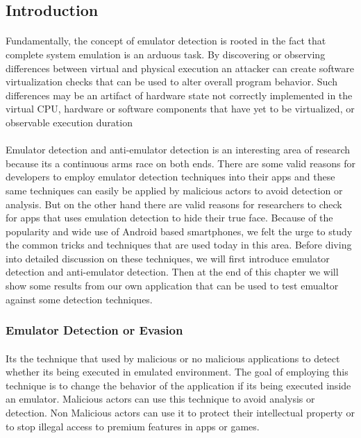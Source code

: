 \documentclass[../main.tex]{subfile}
\begin{document}
	\subsection{Introduction}\label{sec::intorduction}
	\paragraph{} Fundamentally, the concept of emulator detection is rooted in the fact that complete system emulation is an arduous task. By discovering or observing differences between virtual and physical execution an attacker can create software virtualization checks that can be used to alter overall program behavior. Such differences may be an artifact of hardware state not correctly implemented in the virtual CPU, hardware or software components that have yet to be virtualized, or observable execution duration \cite{vidas2014evading}
	\paragraph{} Emulator detection and anti-emulator detection is an interesting area of research because its a continuous arms race on both ends. There are some valid reasons for developers to employ emulator detection techniques into their apps and these same techniques can easily be applied by malicious actors to avoid detection or analysis. But on the other hand there are valid reasons for researchers to check for apps that uses emulation detection to hide their true face. Because of the popularity and wide use of Android based smartphones, we felt the urge to study the common tricks and techniques that are used today in this area. Before diving into detailed discussion on these techniques, we will first introduce emulator detection and anti-emulator detection. Then at the end of this chapter we will show some results from our own application that can be used to test emualtor against some detection techniques.

	\subsubsection{Emulator Detection or Evasion}\label{sec::emu_detection}
	\paragraph{} Its the technique that used by malicious or no malicious applications to detect whether its being executed in emulated environment. The goal of employing this technique is to change the behavior of the application if its being executed inside an emulator. Malicious actors can use this technique to avoid analysis or detection. Non Malicious actors can use it to protect their intellectual property or to stop illegal access to premium features in apps or games.
	
\end{document}
